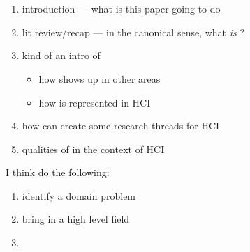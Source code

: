 \documentclass[main]{subfiles}
\begin{document}
\section{\citep{Bardzell:2010:FHT:1753326.1753521}~\cite{Bardzell:2010:FHT:1753326.1753521}}
\begin{enumerate}
  \item introduction --- what is this paper going to do
  \item lit review/recap --- in the canonical sense, what \textit{is} ?
  \item kind of an intro of 
  \begin{itemize}
    \item how  shows up in other areas
    \item how  is represented in HCI
  \end{itemize}
  \item how  can create some research threads for HCI
  \item qualities of  in the context of HCI
\end{enumerate}


I think \citeauthor{Bardzell:2010:FHT:1753326.1753521,postcolonialComputing} do the following:

\begin{enumerate}
  \item identify a domain problem
  \item bring in a high level field
  \item 
\end{enumerate}


\onlyinsubfile{
  
  
}
\end{document}
